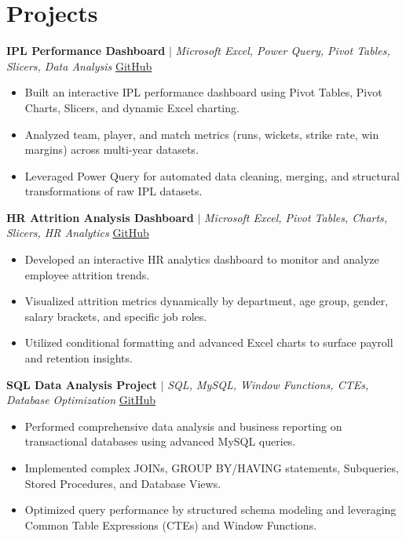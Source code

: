 \documentclass[a4paper,9pt]{article}
\newcommand{\resumeItem}[1]{\item\small #1}
\begin{document}
\vspace{-2mm}

\section{Projects}

\noindent\textbf{IPL Performance Dashboard} $|$ \textit{Microsoft Excel, Power Query, Pivot Tables, Slicers, Data Analysis} \hfill
\href{https://github.com/hsachan295-source/Power-BI-Portfolio}{\small GitHub}
\begin{itemize}
\resumeItem{Built an interactive IPL performance dashboard using Pivot Tables, Pivot Charts, Slicers, and dynamic Excel charting.}
\resumeItem{Analyzed team, player, and match metrics (runs, wickets, strike rate, win margins) across multi-year datasets.}
\resumeItem{Leveraged Power Query for automated data cleaning, merging, and structural transformations of raw IPL datasets.}
\end{itemize}

\vspace{1.5pt}
\noindent\textbf{HR Attrition Analysis Dashboard} $|$ \textit{Microsoft Excel, Pivot Tables, Charts, Slicers, HR Analytics} \hfill
\href{https://github.com/hsachan295-source/Power-BI-Portfolio}{\small GitHub}
\begin{itemize}
\resumeItem{Developed an interactive HR analytics dashboard to monitor and analyze employee attrition trends.}
\resumeItem{Visualized attrition metrics dynamically by department, age group, gender, salary brackets, and specific job roles.}
\resumeItem{Utilized conditional formatting and advanced Excel charts to surface payroll and retention insights.}
\end{itemize}

\vspace{1.5pt}
\noindent\textbf{SQL Data Analysis Project} $|$ \textit{SQL, MySQL, Window Functions, CTEs, Database Optimization} \hfill
\href{https://github.com/hsachan295-source/smart-business-dashboard}{\small GitHub}
\begin{itemize}
\resumeItem{Performed comprehensive data analysis and business reporting on transactional databases using advanced MySQL queries.}
\resumeItem{Implemented complex JOINs, GROUP BY/HAVING statements, Subqueries, Stored Procedures, and Database Views.}
\resumeItem{Optimized query performance by structured schema modeling and leveraging Common Table Expressions (CTEs) and Window Functions.}
\end{itemize}
\end{document}
